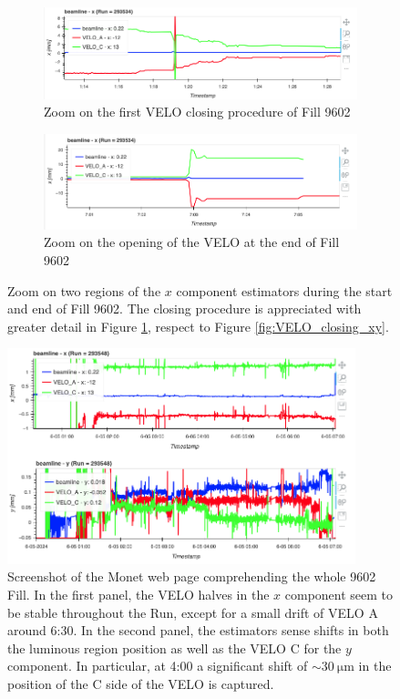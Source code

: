 \begin{figure}
    \centering
    \begin{subfigure}{\textwidth}
    \includegraphics[width=\linewidth]{figures/Velo_closing_zoom.png}
    \caption{Zoom on the first VELO closing procedure of Fill 9602}
    \label{fig:velo_closing_zoom}
    \end{subfigure}\hfill
    \begin{subfigure}{\textwidth}
    \includegraphics[width=\linewidth]{figures/VELO_opens_zoom.png}
    \caption{Zoom on the opening of the VELO at the end of Fill 9602}
    \label{fig:velo_opens_zoom}
    \end{subfigure}
    \caption{Zoom on two regions of the $x$ component estimators during the start and end of Fill 9602. The closing procedure is appreciated with greater detail in Figure \ref{fig:velo_closing_zoom}, respect to Figure \ref{fig:VELO_closing_xy}.}\label{zoom_velo}
\end{figure}

\begin{figure}
    \centering
    \includegraphics[width=0.9\textwidth]{figures/Fill9602.png}
    \caption{Screenshot of the Monet web page comprehending the whole 9602 Fill. In the first panel, the VELO halves in the $x$ component seem to be stable throughout the Run, except for a small drift of VELO A around 6:30. In the second panel, the estimators sense shifts in both the luminous region position as well as the VELO C for the $y$ component. In particular, at 4:00 a significant shift of $\sim\SI{30}{\micro\meter}$ in the position of the C side of the VELO is captured.}
    \label{fig:fill9602}
\end{figure}

